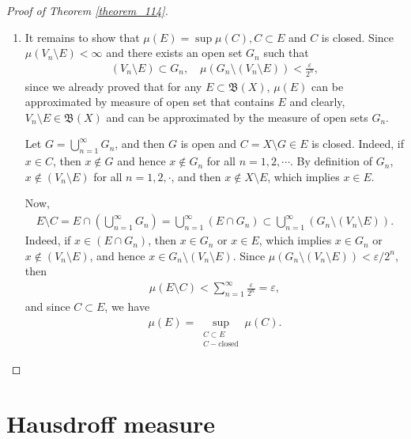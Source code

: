 \documentclass[11pt]{book}
\theoremstyle{definition}
\numberwithin{equation}{chapter}
\begin{document}
\begin{proof}[Proof of Theorem \ref{theorem_114}]
\begin{enumerate}[label=(\alph*)]
    \item It remains to show that $\mu(E) = \sup \mu(C), C \subset E$ and $C$ is closed. Since $\mu(V_n \setminus E) < \infty$ and there exists an open set $G_n$ such that
    \begin{align*}
        \left(V_n \setminus E\right) \subset G_n, \quad \mu\left(G_n \setminus (V_n \setminus E)\right) < \frac{\varepsilon}{2^n},
    \end{align*}
    since we already proved that for any $E \subset \mathfrak{B}(X)$, $\mu(E)$ can be approximated by measure of open set that contains $E$ and clearly, $V_n \setminus E \in \mathfrak{B}(X)$ and can be approximated by the measure of open sets $G_n$. 
    
    Let $G = \bigcup^\infty_{n=1} G_n$, and then $G$ is open and $C = X \setminus G \in E$ is closed. Indeed, if $x \in C$, then $x \notin G$ and hence $x \notin G_n$ for all $n = 1, 2, \cdots$. By definition of $G_n$, $x \notin (V_n \setminus E)$ for all $n = 1, 2, \cdot$, and then $x \notin X\setminus E$, which implies $x \in E$.
    
    Now, 
    \begin{align*}
        E \setminus C = E \cap \left(\bigcup^\infty_{n=1} G_n\right) = \bigcup^\infty_{n=1}(E \cap G_n) \subset \bigcup^\infty_{n=1} \left( G_n\setminus (V_n \setminus E) \right).
    \end{align*}
    Indeed, if $x \in (E \cap G_n)$, then $x \in G_n$ or $x \in E$, which implies $x \in G_n$ or $x \notin (V_n \setminus E)$, and hence $x \in G_n\setminus (V_n \setminus E)$. Since $\mu\left(G_n \setminus (V_n \setminus E)\right) < \varepsilon / 2^n$, then 
    \begin{align*}
        \mu(E \setminus C) < \sum^\infty_{n=1} \frac{\varepsilon}{2^n} = \varepsilon,
    \end{align*}
    and since $C \subset E$, we have 
    \begin{align*}
        \mu(E) = \sup_{\substack{C \subset E\\ C - \text{closed}}} \mu(C).
    \end{align*}
\end{enumerate}
\end{proof}

\medskip

\section{Hausdroff measure}\label{hausdorff_measure}
\end{document}
